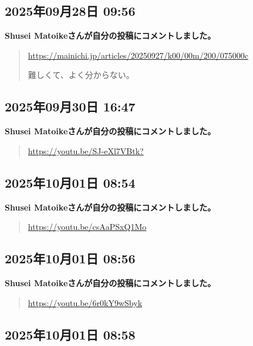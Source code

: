 \subsection*{2025年09月28日 09:56}

\textbf{Shusei Matoikeさんが自分の投稿にコメントしました。}

\begin{quote}
\url{https://mainichi.jp/articles/20250927/k00/00m/200/075000c}

難しくて、よく分からない。
\end{quote}

\subsection*{2025年09月30日 16:47}

\textbf{Shusei Matoikeさんが自分の投稿にコメントしました。}

\begin{quote}
\url{https://youtu.be/SJ-eXl7VBtk?}
\end{quote}

\subsection*{2025年10月01日 08:54}

\textbf{Shusei Matoikeさんが自分の投稿にコメントしました。}

\begin{quote}
\url{https://youtu.be/csAaPSxQ1Mo}
\end{quote}

\subsection*{2025年10月01日 08:56}

\textbf{Shusei Matoikeさんが自分の投稿にコメントしました。}

\begin{quote}
\url{https://youtu.be/6r0kY9wSbyk}
\end{quote}

\subsection*{2025年10月01日 08:58}

